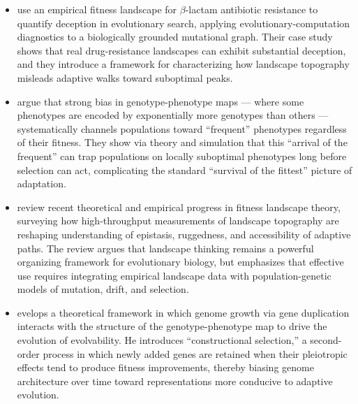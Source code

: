 \begin{itemize}
\item \citet{eppstein2016quantifying} use an empirical fitness landscape for $\beta$-lactam antibiotic resistance to quantify deception in evolutionary search, applying evolutionary-computation diagnostics to a biologically grounded mutational graph.
Their case study shows that real drug-resistance landscapes can exhibit substantial deception, and they introduce a framework for characterizing how landscape topography misleads adaptive walks toward suboptimal peaks.
\item \citet{schaper2014arrival} argue that strong bias in genotype-phenotype maps --- where some phenotypes are encoded by exponentially more genotypes than others --- systematically channels populations toward ``frequent'' phenotypes regardless of their fitness.
They show via theory and simulation that this ``arrival of the frequent'' can trap populations on locally suboptimal phenotypes long before selection can act, complicating the standard ``survival of the fittest'' picture of adaptation.
\item \citet{fragata2019evolution} review recent theoretical and empirical progress in fitness landscape theory, surveying how high-throughput measurements of landscape topography are reshaping understanding of epistasis, ruggedness, and accessibility of adaptive paths.
The review argues that landscape thinking remains a powerful organizing framework for evolutionary biology, but emphasizes that effective use requires integrating empirical landscape data with population-genetic models of mutation, drift, and selection.
\item \citet{altenberg1995genome} evelops a theoretical framework in which genome growth via gene duplication interacts with the structure of the genotype-phenotype map to drive the evolution of evolvability.
He introduces ``constructional selection,'' a second-order process in which newly added genes are retained when their pleiotropic effects tend to produce fitness improvements, thereby biasing genome architecture over time toward representations more conducive to adaptive evolution.
\end{itemize}

